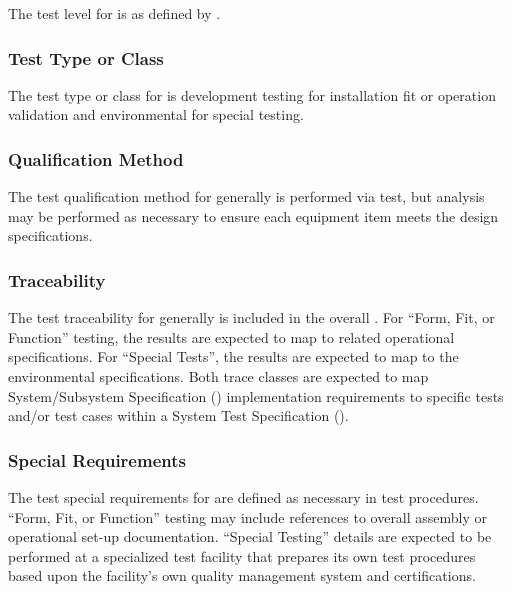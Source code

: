 The test level for \TestIdNameX is \StageThree as defined by \citeStageTestingSTD.

\subsubsection{Test Type or Class}
\label{loc:TestType\TestIdName}

The test type or class for \TestIdNameX is development testing for installation fit or operation validation and environmental for special testing.

\subsubsection{Qualification Method}
\label{loc:TestQualificationMethod\TestIdName}

The test qualification method for \TestIdNameX generally is performed via test, but analysis may be performed as necessary to ensure each equipment item meets the design specifications.

\subsubsection{Traceability}
\label{loc:TestTraceability\TestIdName}

The test traceability for \TestIdNameX generally is included in the overall \RTVM.
For ``Form, Fit, or Function'' testing, the results are expected to map to related operational specifications.
For ``Special Tests'', the results are expected to map to the environmental specifications.
Both trace classes are expected to map System/Subsystem Specification (\SSS) implementation requirements to specific tests and/or test cases within a System Test Specification (\STS).

\subsubsection{Special Requirements}
\label{loc:TestSpecialRequirements\TestIdName}

The test special requirements for \TestIdNameX are defined as necessary in test procedures.
``Form, Fit, or Function'' testing may include references to overall assembly or operational set-up documentation.
``Special Testing'' details are expected to be performed at a specialized test facility that prepares its own test procedures based upon the facility's own quality management system and certifications.


